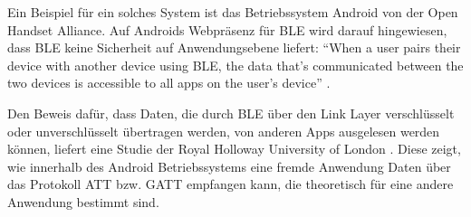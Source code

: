 Ein Beispiel für ein solches System ist das Betriebssystem Android von der Open Handset Alliance. Auf Androids Webpräsenz für BLE wird darauf hingewiesen, dass BLE keine Sicherheit auf Anwendungsebene liefert: "`When a user pairs their device with another device using BLE, the data that's communicated between the two devices is accessible to all apps on the user's device"' \cite{AndroidAppLayerSec}.

Den Beweis dafür, dass Daten, die durch BLE über den Link Layer verschlüsselt oder unverschlüsselt übertragen werden, von anderen Apps ausgelesen werden können, liefert eine Studie der Royal Holloway University of London \cite{RoyalHollowayUniversity}. Diese zeigt, wie innerhalb des Android Betriebssystems eine fremde Anwendung Daten über das Protokoll ATT bzw. GATT 
empfangen kann, die theoretisch für eine andere Anwendung bestimmt sind.



